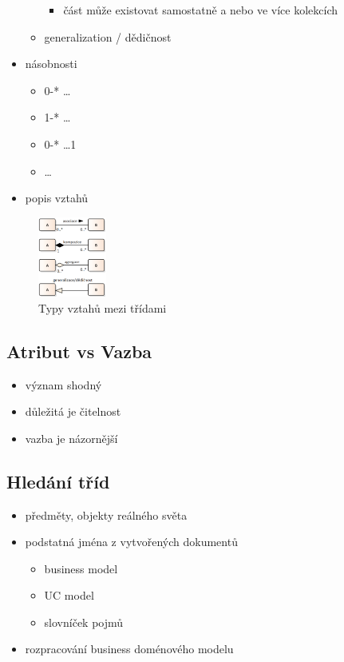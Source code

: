 \documentclass{szzclass}
\begin{document}
\begin{itemize}
\begin{itemize}
\begin{itemize}
            \item část může existovat samostatně a nebo ve více kolekcích
        \end{itemize}
        \item generalization / dědičnost
    \end{itemize}
    \item násobnosti
    \begin{itemize}
        \item 0-* \dots *
        \item 1-* \dots *
        \item 0-* \dots 1
        \item \dots
    \end{itemize}
    \item popis vztahů
\end{itemize}
\begin{figure}[h!]
    \centering
    \includegraphics[width=0.2\textwidth]{topics/bi-spol-31/images/connectionTypes.png}
    \caption{Typy vztahů mezi třídami}
\end{figure}
\subsection{Atribut vs Vazba}
\begin{itemize}
    \item význam shodný
    \item důležitá je čitelnost
    \item vazba je názornější
\end{itemize}

\subsection{Hledání tříd}
\begin{itemize}
    \item předměty, objekty reálného světa
    \item podstatná jména z vytvořených dokumentů
    \begin{itemize}
        \item business model
        \item UC model
        \item slovníček pojmů
    \end{itemize}
    \item rozpracování business doménového modelu
\end{itemize}
\end{document}
